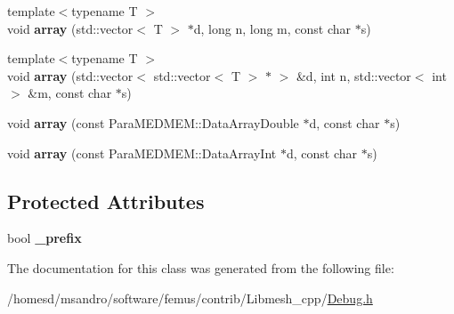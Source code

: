 \begin{DoxyCompactItemize}
\item 
\hypertarget{class_debug_ad906eb2b4e449c9862fdabf09669b080}{{\footnotesize template$<$typename T $>$ }\\void {\bfseries array} (std\-::vector$<$ T $>$ $\ast$d, long n, long m, const char $\ast$s)}\label{class_debug_ad906eb2b4e449c9862fdabf09669b080}

\item 
\hypertarget{class_debug_a02bd26d249b025adb6f8e3c81c57ef39}{{\footnotesize template$<$typename T $>$ }\\void {\bfseries array} (std\-::vector$<$ std\-::vector$<$ T $>$ $\ast$ $>$ \&d, int n, std\-::vector$<$ int $>$ \&m, const char $\ast$s)}\label{class_debug_a02bd26d249b025adb6f8e3c81c57ef39}

\item 
\hypertarget{class_debug_a4c90d826f165cf6e73259eabbc455f9c}{void {\bfseries array} (const Para\-M\-E\-D\-M\-E\-M\-::\-Data\-Array\-Double $\ast$d, const char $\ast$s)}\label{class_debug_a4c90d826f165cf6e73259eabbc455f9c}

\item 
\hypertarget{class_debug_a348c9367ecbd8cb02deabaf7152652e4}{void {\bfseries array} (const Para\-M\-E\-D\-M\-E\-M\-::\-Data\-Array\-Int $\ast$d, const char $\ast$s)}\label{class_debug_a348c9367ecbd8cb02deabaf7152652e4}

\end{DoxyCompactItemize}
\subsection*{Protected Attributes}
\begin{DoxyCompactItemize}
\item 
\hypertarget{class_debug_a2f0df9c6e5cbc734691c50151538de9c}{bool {\bfseries \-\_\-prefix}}\label{class_debug_a2f0df9c6e5cbc734691c50151538de9c}

\end{DoxyCompactItemize}


The documentation for this class was generated from the following file\-:\begin{DoxyCompactItemize}
\item 
/homesd/msandro/software/femus/contrib/\-Libmesh\-\_\-cpp/\hyperlink{_debug_8h}{Debug.\-h}\end{DoxyCompactItemize}
